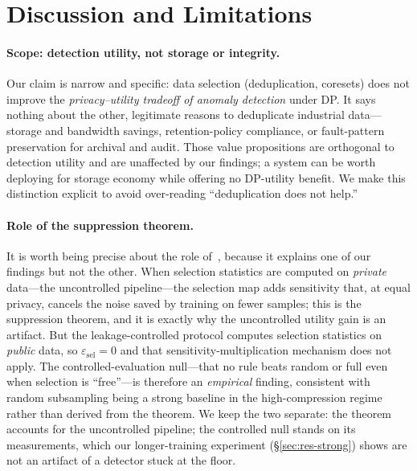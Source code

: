 \documentclass[pdflatex,sn-mathphys-num]{sn-jnl}
\theoremstyle{thmstyleone}
\theoremstyle{thmstyletwo}
\theoremstyle{thmstylethree}
\begin{document}
\section{Discussion and Limitations}\label{sec:discussion}

\paragraph{Scope: detection utility, not storage or integrity.} Our claim is
narrow and specific: data selection (deduplication, coresets) does not improve the
\emph{privacy--utility tradeoff of anomaly detection} under DP. It says nothing
about the other, legitimate reasons to deduplicate industrial data---storage and
bandwidth savings, retention-policy compliance, or fault-pattern preservation for
archival and audit. Those value propositions are orthogonal to detection utility
and are unaffected by our findings; a system can be worth deploying for storage
economy while offering no DP-utility benefit. We make this distinction explicit to
avoid over-reading ``deduplication does not help.''

\paragraph{Role of the suppression theorem.} It is worth being precise about
the role of~\cite{stoddard2026suppress}, because it explains one of our findings but not
the other. When selection statistics are computed on \emph{private} data---the uncontrolled pipeline---the selection map adds sensitivity that, at equal privacy, cancels the noise
saved by training on fewer samples; this is the suppression theorem, and it is exactly
why the uncontrolled utility gain is an artifact. But the leakage-controlled protocol computes selection
statistics on \emph{public} data, so $\varepsilon_{\text{sel}}=0$ and that
sensitivity-multiplication mechanism does not apply. The controlled-evaluation null---that no rule beats random or full even when selection is ``free''---is therefore an \emph{empirical}
finding, consistent with random subsampling being a strong baseline in the
high-compression regime~\cite{ayle2023bagging} rather than derived from the theorem. We
keep the two separate: the theorem accounts for the uncontrolled pipeline; the controlled null stands
on its measurements, which our longer-training experiment (\S\ref{sec:res-strong}) shows
are not an artifact of a detector stuck at the floor.
\end{document}
